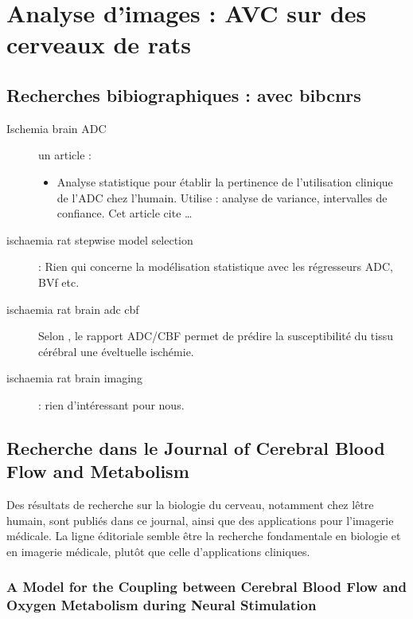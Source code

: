 \section{Analyse d'images : AVC sur des cerveaux de rats}\label{sani}

\subsection{Recherches bibiographiques : avec bibcnrs}

\begin{description}
\item[Ischemia brain ADC] un article :
\begin{itemize}
\item \cite{mej} Analyse statistique pour \'etablir la pertinence de l'utilisation clinique de l'ADC chez l'humain. Utilise : analyse de variance, intervalles de confiance. Cet article cite \dots

\end{itemize}


\item[ischaemia rat stepwise model selection] : Rien qui concerne la mod\'elisation statistique avec les r\'egresseurs ADC, BVf etc.
\item[ischaemia rat brain adc cbf] Selon \cite{leeliu}, le rapport ADC/CBF permet de pr\'edire la susceptibilit\'e du tissu c\'er\'ebral %
 une \'eveltuelle isch\'emie.
\item[ischaemia rat brain imaging] : rien d'int\'eressant pour nous.
\end{description}

\subsection{Recherche dans le Journal of Cerebral Blood Flow and Metabolism}

Des r\'esultats de recherche sur la biologie du cerveau, notamment chez l\^etre humain, sont publi\'es dans ce journal, %
ainsi que des applications pour l'imagerie m\'edicale. %
La ligne \'editoriale semble \^etre la recherche fondamentale en biologie et en imagerie m\'edicale, %
plut\^ot que celle d'applications cliniques.

\subsubsection{A Model for the Coupling between Cerebral Blood Flow and Oxygen Metabolism during Neural Stimulation \cite{bufr97}}

